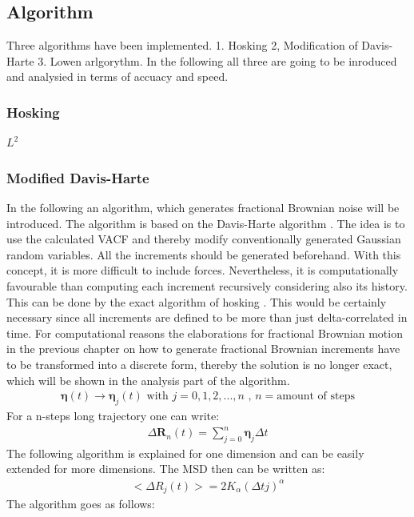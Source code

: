 \documentclass[
  a4paper,BCOR10mm,oneside,
  bibtotoc,idxtotoc,
  headsepline,footsepline,%
  fleqn,openbib
]{scrbook}
\begin{document}
\subsection{Algorithm}
Three algorithms have been implemented. 
1. Hosking 2, Modification of Davis-Harte 3. Lowen arlgorythm. In the following all three are going to be inroduced and analysied in terms of accuacy and speed. 
\subsubsection{Hosking}



$L^2$
\subsubsection{Modified Davis-Harte}
In the following an algorithm, which generates fractional Brownian noise will be introduced. The algorithm is based on the Davis-Harte algorithm \cite{Craigmile2003}. The idea is to use the calculated VACF and thereby modify conventionally generated Gaussian random variables. All the increments should be generated beforehand. With this concept, it is more difficult to include forces. Nevertheless, it is computationally favourable than computing each increment recursively considering also its history. This can be done by the exact algorithm of hosking \cite{WRCR:WRCR3676}. This would be certainly necessary since all increments are defined to be more than just delta-correlated in time. For computational reasons the elaborations for fractional Brownian motion in the previous chapter on how to generate fractional Brownian increments have to be transformed into a discrete form, thereby the solution is no longer exact, which will be shown in the analysis part of the algorithm.  
\begin{align}
\bm{\eta} (t) \longrightarrow \bm{\eta}_j(t)  \text{  with  } j=0,1,2,...,n  \text{  ,  } n= \text{amount of steps}
\end{align}
For a n-steps long trajectory one can write:
\begin{align}
 \Delta \bm{R}_n(t) =  \sum_{j=0}^n \bm{\eta}_j  \Delta t \label{eq:diskretdeltar}
\end{align}
 The following algorithm is explained for one dimension and can be easily extended for more dimensions. The MSD then can be written as:
\begin{align}
< \Delta R_{j}(t)>=2K_{\alpha} (\Delta t j)^{\alpha}
\end{align}
The algorithm goes as follows:
\end{document}
